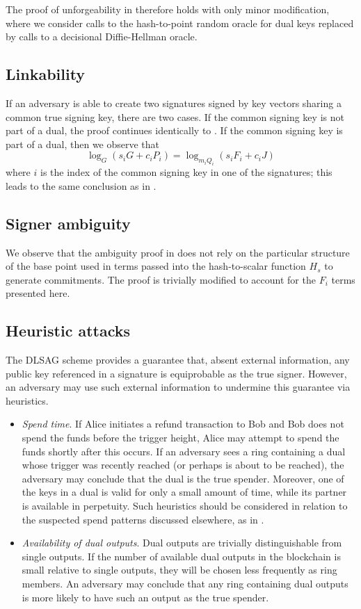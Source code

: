 \documentclass{mrl}
\begin{document}
The proof of unforgeability in \cite{shen} therefore holds with only minor modification, where we consider calls to the hash-to-point random oracle for dual keys replaced by calls to a decisional Diffie-Hellman oracle.

\subsection{Linkability}
If an adversary is able to create two signatures signed by key vectors sharing a common true signing key, there are two cases. If the common signing key is not part of a dual, the proof continues identically to \cite{shen}. If the common signing key is part of a dual, then we observe that $$\log_G(s_iG + c_iP_i) = \log_{m_iQ_i}(s_iF_i + c_iJ)$$ where $i$ is the index of the common signing key in one of the signatures; this leads to the same conclusion as in \cite{shen}.

\subsection{Signer ambiguity}
We observe that the ambiguity proof in \cite{shen} does not rely on the particular structure of the base point used in terms passed into the hash-to-scalar function $H_s$ to generate commitments. The proof is trivially modified to account for the $F_i$ terms presented here. 

\subsection{Heuristic attacks}
The DLSAG scheme provides a guarantee that, absent external information, any public key referenced in a signature is equiprobable as the true signer. However, an adversary may use such external information to undermine this guarantee via heuristics.
\begin{itemize}
\item \textit{Spend time}. If Alice initiates a refund transaction to Bob and Bob does not spend the funds before the trigger height, Alice may attempt to spend the funds shortly after this occurs. If an adversary sees a ring containing a dual whose trigger was recently reached (or perhaps is about to be reached), the adversary may conclude that the dual is the true spender. Moreover, one of the keys in a dual is valid for only a small amount of time, while its partner is available in perpetuity. Such heuristics should be considered in relation to the suspected spend patterns discussed elsewhere, as in \cite{monerolink,monerolink2}.
\item \textit{Availability of dual outputs}. Dual outputs are trivially distinguishable from single outputs. If the number of available dual outputs in the blockchain is small relative to single outputs, they will be chosen less frequently as ring members. An adversary may conclude that any ring containing dual outputs is more likely to have such an output as the true spender.
\end{itemize}
\end{document}

